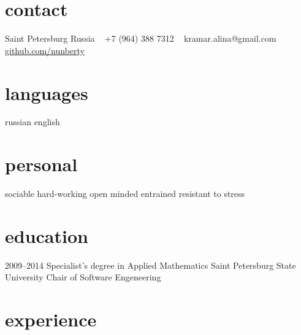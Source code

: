 \documentclass[]{friggeri-cv} %
\begin{document}


\begin{aside} %
\section{contact}
Saint Petersburg
Russia
~
+7 (964) 388 7312
~
kramar.alina@gmail.com
\href{https://github.com/nunberty}{github.com/nunberty}
\section{languages}
russian
english
\section{personal}
sociable
hard-working
open minded
entrained
resistant to stress
\end{aside}

\section{education}

\begin{entrylist}
\entry
{2009--2014}
{Specialist's degree {\normalfont in Applied Mathematics}}
{Saint Petersburg State University}
{Chair of Software Engeneering}
\end{entrylist}

\section{experience}
\end{document}
